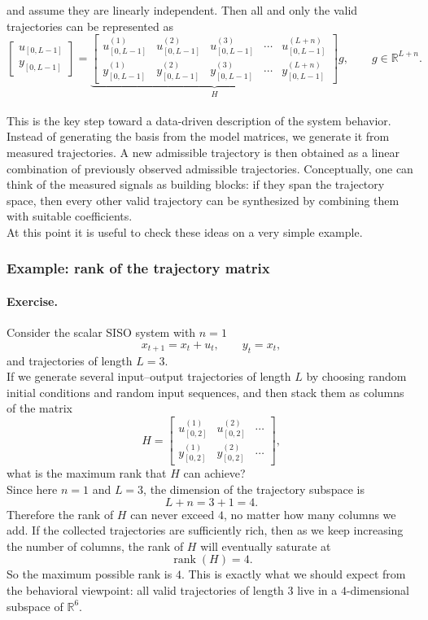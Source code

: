 and assume they are linearly independent. Then all and only the valid trajectories can be represented as
\[
\begin{bmatrix}
u_{[0,L-1]}\\[1mm]
y_{[0,L-1]}
\end{bmatrix}
=
\underbrace{
\begin{bmatrix}
u^{(1)}_{[0,L-1]} & u^{(2)}_{[0,L-1]} & u^{(3)}_{[0,L-1]} & \cdots & u^{(L+n)}_{[0,L-1]}\\[1mm]
y^{(1)}_{[0,L-1]} & y^{(2)}_{[0,L-1]} & y^{(3)}_{[0,L-1]} & \cdots & y^{(L+n)}_{[0,L-1]}
\end{bmatrix}}_{H}
g,
\qquad g\in\mathbb{R}^{L+n}.
\]\\
This is the key step toward a data-driven description of the system behavior. Instead of generating the basis from the model matrices, we generate it from measured trajectories. A new admissible trajectory is then obtained as a linear combination of previously observed admissible trajectories. Conceptually, one can think of the measured signals as building blocks: if they span the trajectory space, then every other valid trajectory can be synthesized by combining them with suitable coefficients.\\

At this point it is useful to check these ideas on a very simple example.
\subsubsection{Example: rank of the trajectory matrix}
\paragraph{Exercise.}
Consider the scalar SISO system with $n=1$
\[
x_{t+1}=x_t+u_t,
\qquad
y_t=x_t,
\]
and trajectories of length $L=3$.\\
If we generate several input--output trajectories of length $L$ by choosing random initial conditions and random input sequences, and then stack them as columns of the matrix
\[
H=
\begin{bmatrix}
u^{(1)}_{[0,2]} & u^{(2)}_{[0,2]} & \cdots \\
y^{(1)}_{[0,2]} & y^{(2)}_{[0,2]} & \cdots
\end{bmatrix},
\]
what is the maximum rank that $H$ can achieve?\\
Since here $n=1$ and $L=3$, the dimension of the trajectory subspace is
\[
L+n=3+1=4.
\]
Therefore the rank of $H$ can never exceed $4$, no matter how many columns we add. If the collected trajectories are sufficiently rich, then as we keep increasing the number of columns, the rank of $H$ will eventually saturate at
\[
\operatorname{rank}(H)=4.
\]
So the maximum possible rank is $4$. This is exactly what we should expect from the behavioral viewpoint: all valid trajectories of length $3$ live in a $4$-dimensional subspace of $\mathbb{R}^{6}$.\\
